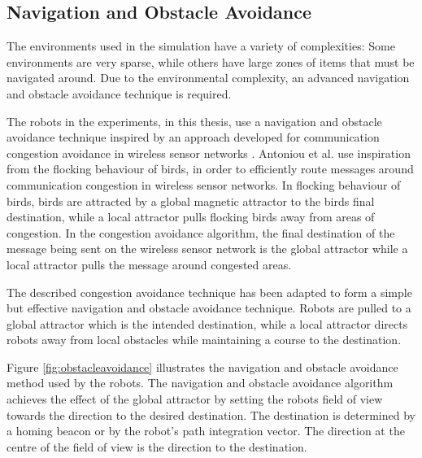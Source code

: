 \subsection{Navigation and Obstacle Avoidance}
\label{navigationandobstacleavoidance}

The environments used in the simulation have a variety of complexities: Some environments are very sparse, while others have large zones of items that must be navigated around. Due to the environmental complexity, an advanced navigation and obstacle avoidance technique is required. 

The robots in the experiments, in this thesis, use a navigation and obstacle avoidance technique inspired by an approach developed for communication congestion avoidance in wireless sensor networks \cite{antoniou2012congestion}. Antoniou et al. use inspiration from the flocking behaviour of birds, in order to efficiently route messages around communication congestion in wireless sensor networks. In flocking behaviour of birds, birds are attracted by a global magnetic attractor to the birds final destination, while a local attractor pulls flocking birds away from areas of congestion. In the congestion avoidance algorithm, the final destination of the message being sent on the wireless sensor network is the global attractor while a local attractor pulls the message around congested areas.

The described congestion avoidance technique has been adapted to form a simple but effective navigation and obstacle avoidance technique. Robots are pulled to a global attractor which is the intended destination, while a local attractor directs robots away from local obstacles while maintaining a course to the destination.

Figure \ref{fig:obstacleavoidance} illustrates the navigation and obstacle avoidance method used by the robots. The navigation and obstacle avoidance algorithm achieves the effect of the global attractor by setting the robots field of view towards the direction to the desired destination. The destination is determined by a homing beacon or by the robot's path integration vector. The direction at the centre of the field of view is the direction to the destination. 

